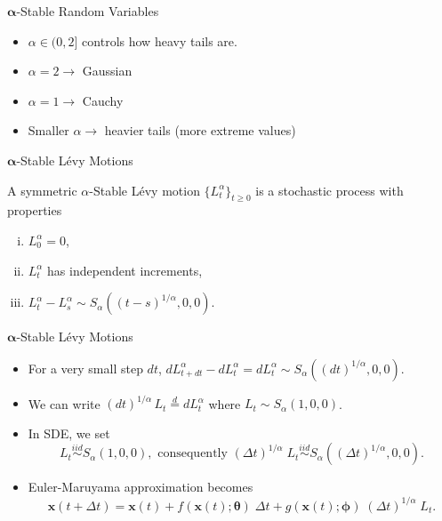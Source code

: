 \begin{frame}{$\boldsymbol{\alpha}$-Stable Random Variables}

\begin{itemize}
\item<1-> $\alpha \in (0, 2]$ controls how heavy tails are.

\item<2-> $\alpha = 2 \rightarrow$ Gaussian

\item<3-> $\alpha = 1 \rightarrow$ Cauchy

\item<4-> Smaller $\alpha \rightarrow$ heavier tails (more extreme values)
\end{itemize}

\end{frame}



\begin{frame}{$\boldsymbol{\alpha}$-Stable Lévy Motions}

A symmetric $\alpha$-Stable Lévy motion $\{L_t^{\alpha}\}_{t \geq 0}$ is a stochastic process with properties

\vspace{0.2cm}

\begin{enumerate}[(i)]
\item $L_0^{\alpha} = 0$,
\vspace{0.2cm}
\item $L_t^{\alpha}$ has independent increments,
\vspace{0.2cm}
\item $L_t^{\alpha} - L_s^{\alpha} \sim S_{\alpha}\left( (t-s)^{1 / \alpha}, 0, 0 \right)$.
\end{enumerate}

\end{frame}



\begin{frame}{$\boldsymbol{\alpha}$-Stable Lévy Motions}

\begin{itemize}
\item<1-> For a very small step $dt$, $dL_{t + dt}^{\alpha} - dL_{t}^{\alpha} = dL_t^{\alpha} \sim S_{\alpha}\left( (dt)^{1 / \alpha}, 0, 0 \right)$.

\item<2-> We can write $(dt)^{1 / \alpha} \, L_t \overset{d}{=} dL_t^{\alpha}$ where $L_t \sim S_{\alpha} (1, 0, 0)$.

\item<3-> In SDE, we set $$L_t \overset{iid}{\sim} S_{\alpha}(1, 0, 0), \text{ consequently } (\Delta t)^{1 / \alpha} \; L_t \overset{iid}{\sim} S_{\alpha}\left((\Delta t)^{1 / \alpha}, 0, 0\right).$$

\item<4-> Euler-Maruyama approximation becomes $$\boldsymbol{x}(t+\Delta t) = \boldsymbol{x}(t)+ f(\boldsymbol{x}(t); \boldsymbol{\theta}) \; \Delta t + g(\boldsymbol{x}(t); \boldsymbol{\phi}) \; (\Delta t)^{1 / \alpha} \; L_t.$$
\end{itemize}

\end{frame}
